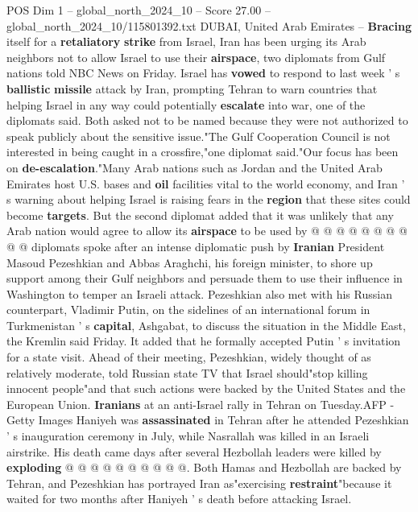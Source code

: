 \begin{textsample}{POS Dim 1 – global\_north\_2024\_10 – Score 27.00 – global\_north\_2024\_10/115801392.txt}  \label{ex:f1_pos_083}
DUBAI, United Arab Emirates -- \textbf{Bracing} itself for a \textbf{retaliatory} \textbf{strike} from Israel, Iran has been urging its Arab neighbors not to allow Israel to use their \textbf{airspace}, two diplomats from Gulf nations told NBC News on Friday.
Israel has \textbf{vowed} to respond to last week ' s \textbf{ballistic} \textbf{missile} attack by Iran, prompting Tehran to warn countries that helping Israel in any way could potentially \textbf{escalate} into war, one of the diplomats said.
Both asked not to be named because they were not authorized to speak publicly about the sensitive issue."The Gulf Cooperation Council is not interested in being caught in a crossfire,"one diplomat said."Our focus has been on \textbf{de-escalation}."Many Arab nations such as Jordan and the United Arab Emirates host U.S. bases and \textbf{oil} facilities vital to the world economy, and Iran ' s warning about helping Israel is raising fears in the \textbf{region} that these sites could become \textbf{targets}.
But the second diplomat added that it was unlikely that any Arab nation would agree to allow its \textbf{airspace} to be used by @ @ @ @ @ @ @ @ @ @ diplomats spoke after an intense diplomatic push by \textbf{Iranian} President Masoud Pezeshkian and Abbas Araghchi, his foreign minister, to shore up support among their Gulf neighbors and persuade them to use their influence in Washington to temper an Israeli attack.
Pezeshkian also met with his Russian counterpart, Vladimir Putin, on the sidelines of an international forum in Turkmenistan ' s \textbf{capital}, Ashgabat, to discuss the situation in the Middle East, the Kremlin said Friday.
It added that he formally accepted Putin ' s invitation for a state visit.
Ahead of their meeting, Pezeshkian, widely thought of as relatively moderate, told Russian state TV that Israel should"stop killing innocent people"and that such actions were backed by the United States and the European Union. \textbf{Iranians} at an anti-Israel rally in Tehran on Tuesday.AFP - Getty Images Haniyeh was \textbf{assassinated} in Tehran after he attended Pezeshkian ' s inauguration ceremony in July, while Nasrallah was killed in an Israeli airstrike.
His death came days after several Hezbollah leaders were killed by \textbf{exploding} @ @ @ @ @ @ @ @ @ @.
Both Hamas and Hezbollah are backed by Tehran, and Pezeshkian has portrayed Iran as"exercising \textbf{restraint}"because it waited for two months after Haniyeh ' s death before attacking Israel.

\end{textsample}
